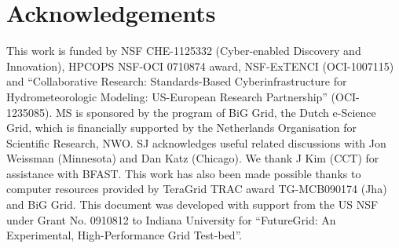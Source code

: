 \documentclass[conference]{IEEEtran}
\begin{document}
\section*{Acknowledgements}
\footnotesize \footnotesize{This work is funded by NSF CHE-1125332
  (Cyber-enabled Discovery and Innovation), HPCOPS NSF-OCI 0710874
  award, NSF-ExTENCI (OCI-1007115) and ``Collaborative Research:
  Standards-Based Cyberinfrastructure for Hydrometeorologic Modeling:
  US-European Research Partnership'' (OCI-1235085).  MS is sponsored
  by the program of BiG Grid, the Dutch e-Science Grid, which is
  financially supported by the Netherlands Organisation for Scientific
  Research, NWO. SJ acknowledges useful related discussions with Jon
  Weissman (Minnesota) and Dan Katz (Chicago). We thank J Kim (CCT)
  for assistance with BFAST.  This work has also been made possible
  thanks to computer resources provided by TeraGrid TRAC award
  TG-MCB090174 (Jha) and BiG Grid.  This document was developed with
  support from the US NSF under Grant No. 0910812 to Indiana
  University for ``FutureGrid: An Experimental, High-Performance Grid
  Test-bed''.}

  


\end{document}
